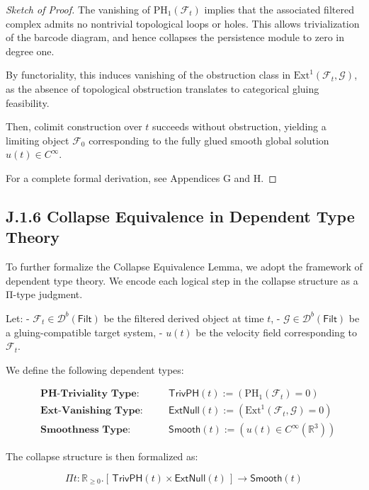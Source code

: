\documentclass[11pt]{article}
\theoremstyle{definition}
\begin{document}
\begin{proof}[Sketch of Proof]
The vanishing of \( \mathrm{PH}_1(\mathcal{F}_t) \) implies that the associated filtered complex  
admits no nontrivial topological loops or holes. This allows trivialization of the barcode diagram,  
and hence collapses the persistence module to zero in degree one.

By functoriality, this induces vanishing of the obstruction class in \( \mathrm{Ext}^1(\mathcal{F}_t, \mathcal{G}) \),  
as the absence of topological obstruction translates to categorical gluing feasibility.

Then, colimit construction over \( t \) succeeds without obstruction, yielding a limiting object  
\( \mathcal{F}_0 \) corresponding to the fully glued smooth global solution \( u(t) \in C^\infty \).

For a complete formal derivation, see Appendices G and H.
\end{proof}

\subsection*{J.1.6 Collapse Equivalence in Dependent Type Theory}

To further formalize the Collapse Equivalence Lemma, we adopt the framework of dependent type theory.  
We encode each logical step in the collapse structure as a Π-type judgment.

Let:
- \( \mathcal{F}_t \in \mathcal{D}^b(\mathsf{Filt}) \) be the filtered derived object at time \( t \),
- \( \mathcal{G} \in \mathcal{D}^b(\mathsf{Filt}) \) be a gluing-compatible target system,
- \( u(t) \) be the velocity field corresponding to \( \mathcal{F}_t \).

We define the following dependent types:

\begin{align*}
& \textbf{PH-Triviality Type:} \quad && \mathsf{TrivPH}(t) := \left( \mathrm{PH}_1(\mathcal{F}_t) = 0 \right) \\
& \textbf{Ext-Vanishing Type:} \quad && \mathsf{ExtNull}(t) := \left( \mathrm{Ext}^1(\mathcal{F}_t, \mathcal{G}) = 0 \right) \\
& \textbf{Smoothness Type:} \quad && \mathsf{Smooth}(t) := \left( u(t) \in C^\infty(\mathbb{R}^3) \right)
\end{align*}

The collapse structure is then formalized as:

\[
\Pi t : \mathbb{R}_{\geq 0}. \left[\, \mathsf{TrivPH}(t) \times \mathsf{ExtNull}(t) \,\right] \to \mathsf{Smooth}(t)
\]
\end{document}
